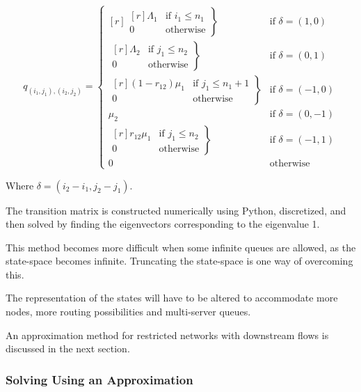 \documentclass{article}
\begin{document}
\begin{equation}
  q_{(i_1, j_1),(i_2, j_2)} = \left\{
  \begin{matrix*}[ r ]
    \left. \begin{matrix*}[ r ]
      \Lambda_1 & \text{if } i_1 \leq n_1 \\
      0 & \text{otherwise}
    \end{matrix*} \right\} & \text{if } \delta = (1, 0) \\
    \left. \begin{matrix*}[ r ]
      \Lambda_2 & \text{if } j_1 \leq n_2 \\
      0 & \text{otherwise}
    \end{matrix*} \right\} & \text{if } \delta = (0, 1) \\
    \left. \begin{matrix*}[ r ]
      (1 - r_{12})\mu_1 & \text{if } j_1 \leq n_1 + 1 \\
      0 & \text{otherwise}
    \end{matrix*} \right\} & \text{if } \delta = (-1, 0) \\
    \mu_2 & \text{if } \delta = (0, -1) \\
    \left. \begin{matrix*}[ r ]
      r_{12}\mu_1 & \text{if } j_1 \leq n_2 \\
      0 & \text{otherwise}
    \end{matrix*} \right\} & \text{if } \delta = (-1, 1) \\
    0 & \text{otherwise}
  \end{matrix*} \right.
\end{equation}

Where $\delta = (i_2-i_1, j_2-j_1)$.

The transition matrix is constructed numerically using Python, discretized, and then solved by finding the eigenvectors corresponding to the eigenvalue 1.

This method becomes more difficult when some infinite queues are allowed, as the state-space becomes infinite.
Truncating the state-space is one way of overcoming this.

The representation of the states will have to be altered to accommodate more nodes, more routing possibilities and multi-server queues.



An approximation method for restricted networks with downstream flows is discussed in the next section.

\subsubsection{Solving Using an Approximation}
\end{document}
